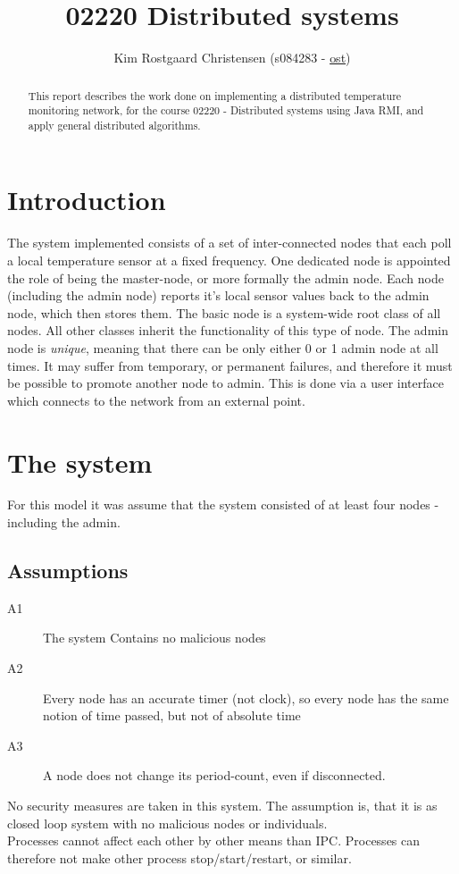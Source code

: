 \documentclass[10pt,a4paper]{article}
\begin{document}
\def\File#1{\textsf{#1}}
\def\Code#1{\texttt{#1}}
\def\Key#1{\textsf{#1}}

\title{02220 Distributed systems}
\author{Kim Rostgaard Christensen (s084283 - \href{mailto:kroch@imm.dtu.dk}{ost})}

\maketitle

\tableofcontents

\begin{abstract}
This report describes the work done on implementing a distributed temperature monitoring network, for the course 02220 - Distributed systems using Java RMI, and apply general distributed algorithms.
\end{abstract}

\section{Introduction}
The system implemented consists of a set of inter-connected nodes that each poll a local temperature sensor at a fixed frequency. One dedicated node is appointed the role of being the master-node, or more formally the admin node. Each node (including the admin node) reports it's local sensor values back to the admin node, which then stores them.
The basic node is a system-wide root class of all nodes. All other classes inherit the functionality of this type of node.
The admin node is \emph{unique}, meaning that there can be only either 0 or 1 admin node at all times. It may suffer from temporary, or permanent failures, and therefore it must be possible to promote another node to admin. This is done via a user interface which connects to the network from an external point.

\section{The system}

For this model it was assume that the system consisted of at least four nodes - including the admin.

\subsection{Assumptions}

\begin{description}
 \item[A1] The system Contains no malicious nodes
 \item[A2] Every node has an accurate timer (not clock), so every node has the same notion of time passed, but not of absolute time
 \item[A3] A node does not change its period-count, even if disconnected.
\end{description} 
No security measures are taken in this system. The assumption is, that it is as closed loop system with no malicious nodes or individuals.\\
Processes cannot affect each other by other means than IPC. Processes can therefore not make other process stop/start/restart, or similar.
\end{document}
